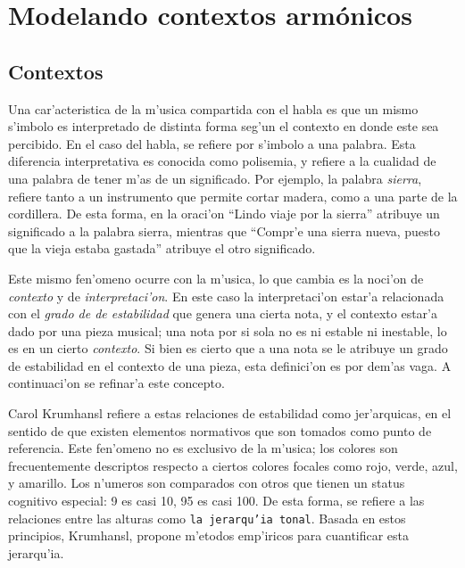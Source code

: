 \section{Modelando contextos arm\'onicos}
\label{sec:harmonic_contexts}
\subsection{Contextos}
Una car'acteristica de la m'usica compartida con el habla es que un mismo s'imbolo es interpretado de distinta forma seg'un el contexto
en donde este sea percibido. En el caso del habla, se refiere por s'imbolo a una palabra. Esta diferencia interpretativa es conocida 
como polisemia, y refiere a la cualidad de una palabra de tener m'as de un significado. Por ejemplo, la palabra \emph{sierra}, refiere
tanto a un instrumento que permite cortar madera, como a una parte de la cordillera. De esta forma, en la oraci'on 
``Lindo viaje por la sierra'' atribuye un significado a la palabra sierra, mientras que ``Compr'e una sierra nueva, puesto que la vieja 
estaba gastada'' atribuye el otro significado. 

Este mismo fen'omeno ocurre con la m'usica, lo que cambia es la noci'on de \emph{contexto} y de \emph{interpretaci'on}. En este caso
la interpretaci'on estar'a relacionada con el \emph{grado de de estabilidad} que genera una cierta nota, y el contexto estar'a dado por
una pieza musical; una nota por si sola no es ni estable ni inestable, lo es en un cierto \emph{contexto}. Si bien es cierto que a una nota
se le atribuye un grado de estabilidad en el contexto de una pieza, esta definici'on es por dem'as vaga. A continuaci'on se refinar'a
este concepto.

Carol Krumhansl \citep{Krumhansl90} refiere a estas relaciones de estabilidad como jer'arquicas, en el sentido de que existen elementos normativos que son tomados 
como punto de referencia. Este fen'omeno no es exclusivo de la m'usica; los colores son frecuentemente descriptos respecto a ciertos colores 
focales como rojo, verde, azul, y amarillo. Los n'umeros son comparados con otros que tienen un status cognitivo especial: 9 es casi 10, 95 es casi 100. 
De esta forma, se refiere a las relaciones entre las alturas como \texttt{la jerarqu'ia tonal}. Basada en estos principios, Krumhansl, 
propone m'etodos emp'iricos para cuantificar esta jerarqu'ia.


